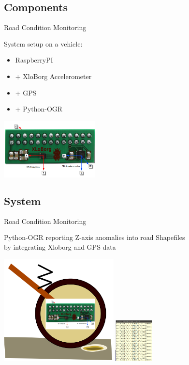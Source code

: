 \documentclass[xcolor=dvipsnames,beamer]{beamer} %
\begin{document}
\subsection{Components}
\begin{frame}[fragile]{Road Condition Monitoring}

System setup on a vehicle:
\vspace{5mm}
\begin{itemize}
 \item RaspberryPI
 \item + XloBorg Accelerometer
 \item + GPS 
 \item + Python-OGR
\end{itemize}

\begin{center}
 \includegraphics[width=5cm]{xloborg_axis_details}
\end{center}
\end{frame}

\subsection{System}
\begin{frame}[fragile]{Road Condition Monitoring}

Python-OGR reporting Z-axis anomalies into road Shapefiles\\
by integrating Xloborg and GPS data

\begin{center}
 \includegraphics[width=6cm]{road_condition}
 \hspace{5mm}
 \includegraphics[width=2cm]{accelerometer_data}
\end{center}

\end{frame}
\end{document}
